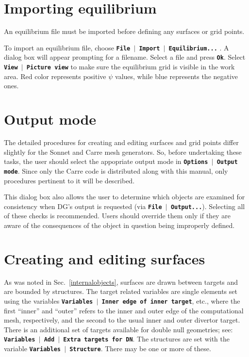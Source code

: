 \documentclass[12pt]{report}
\begin{document}
\section{Importing equilibrium}

An equilibrium file must be imported before defining any surfaces or
grid points.

To import an equilibrium file, choose
\textbf{\texttt{File $\mid$ Import $\mid$ Equilibrium...}} . A
dialog box will appear prompting for a filename. Select a file and
press \textbf{\texttt{Ok}}. Select
\textbf{\texttt{View \begin{math}\vert{}\end{math} Picture view}} to make
sure the equilibrium grid is visible in the work area. Red color
represents positive  \begin{math}\psi{}\end{math}  values, while blue
represents the negative ones.

\section{Output mode}

The detailed procedures for creating and editing surfaces and grid
points differ slightly for the Sonnet and Carre mesh generators.
So, before undertaking these tasks, the user should select the
appopriate output mode in \textbf{\texttt{Options $\mid$ Output mode}}.
Since only the Carre code is distributed along with this manual,
only procedures pertinent to it will be described.

This dialog box also allows the user to determine which objects are
examined for consistency when DG's output is requested
(via \textbf{\texttt{File $\mid$ Output...}}).  Selecting all of these
checks is recommended.  Users should override them only if they are
aware of the consequences of the object in question being improperly
defined.

\section{Creating and editing surfaces}
\label{createsurfaces}

As was noted in Sec.~\ref{internalobjects}, surfaces are drawn between
targets and are bounded by structures.  
The target related variables are single elements set using the
variables 
\textbf{\texttt{Variables $\mid$ Inner edge of inner target}}, etc.,
where the first ``inner'' and ``outer'' refers to the inner and outer edge
of the computational mesh, respectively, and the second to the
usual inner and outer divertor target.  There is an additional
set of targets available for double null geometries; see:
\textbf{\texttt{Variables $\mid$ Add $\mid$ Extra targets for DN}}.
The structures are set with the variable
\textbf{\texttt{Variables $\mid$ Structure}}.  There may be one or more
of these.
\end{document}
